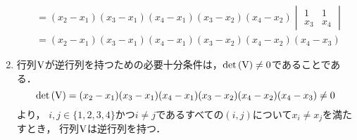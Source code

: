 \begin{enumerate}[label=(\roman*)]
\begin{align}
          &= (x_2 - x_1) (x_3 - x_1) (x_4 - x_1) (x_3 - x_2) (x_4 - x_2)
          \begin{vmatrix}
            1 & 1 \\
            x_3 & x_4
          \end{vmatrix}\\
          &= (x_2 - x_1) (x_3 - x_1) (x_4 - x_1) (x_3 - x_2) (x_4 - x_2) (x_4 - x_3)
      \end{align}
    \item 行列$\mathrm{V}$が逆行列を持つための必要十分条件は，$\det{(\mathrm{V})} \neq 0$であることである．
      \begin{equation}
        \det{(\mathrm{V})} = (x_2 - x_1) (x_3 - x_1) (x_4 - x_1) (x_3 - x_2) (x_4 - x_2) (x_4 - x_3) \neq 0
      \end{equation}
      より，
      $i, j \in \{1, 2, 3, 4\}$かつ$i \neq j$であるすべての$(i, j)$について$x_i \neq x_j$を満たすとき，
      行列$\mathrm{V}$は逆行列を持つ．
  \end{enumerate}
      
\clearpage
